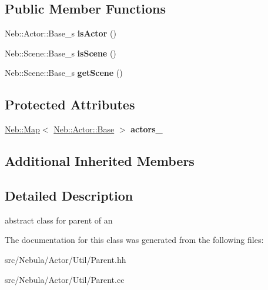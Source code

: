 \subsection*{Public Member Functions}
\begin{DoxyCompactItemize}
\item 
\hypertarget{classNeb_1_1Actor_1_1Util_1_1Parent_a00f5de8963b3749667887cb28c417580}{Neb\-::\-Actor\-::\-Base\-\_\-s {\bfseries is\-Actor} ()}\label{classNeb_1_1Actor_1_1Util_1_1Parent_a00f5de8963b3749667887cb28c417580}

\item 
\hypertarget{classNeb_1_1Actor_1_1Util_1_1Parent_a4ff4abb4738c49f1d54181433ebcc183}{Neb\-::\-Scene\-::\-Base\-\_\-s {\bfseries is\-Scene} ()}\label{classNeb_1_1Actor_1_1Util_1_1Parent_a4ff4abb4738c49f1d54181433ebcc183}

\item 
\hypertarget{classNeb_1_1Actor_1_1Util_1_1Parent_a57e146291377e847f2151da71cfb78aa}{Neb\-::\-Scene\-::\-Base\-\_\-s {\bfseries get\-Scene} ()}\label{classNeb_1_1Actor_1_1Util_1_1Parent_a57e146291377e847f2151da71cfb78aa}

\end{DoxyCompactItemize}
\subsection*{Protected Attributes}
\begin{DoxyCompactItemize}
\item 
\hypertarget{classNeb_1_1Actor_1_1Util_1_1Parent_a8e94b36b842a32a3d9d17fd1a36e30d8}{\hyperlink{classNeb_1_1Map}{Neb\-::\-Map}$<$ \hyperlink{classNeb_1_1Actor_1_1Base}{Neb\-::\-Actor\-::\-Base} $>$ {\bfseries actors\-\_\-}}\label{classNeb_1_1Actor_1_1Util_1_1Parent_a8e94b36b842a32a3d9d17fd1a36e30d8}

\end{DoxyCompactItemize}
\subsection*{Additional Inherited Members}


\subsection{Detailed Description}
abstract class for parent of an  

The documentation for this class was generated from the following files\-:\begin{DoxyCompactItemize}
\item 
src/\-Nebula/\-Actor/\-Util/Parent.\-hh\item 
src/\-Nebula/\-Actor/\-Util/Parent.\-cc\end{DoxyCompactItemize}
